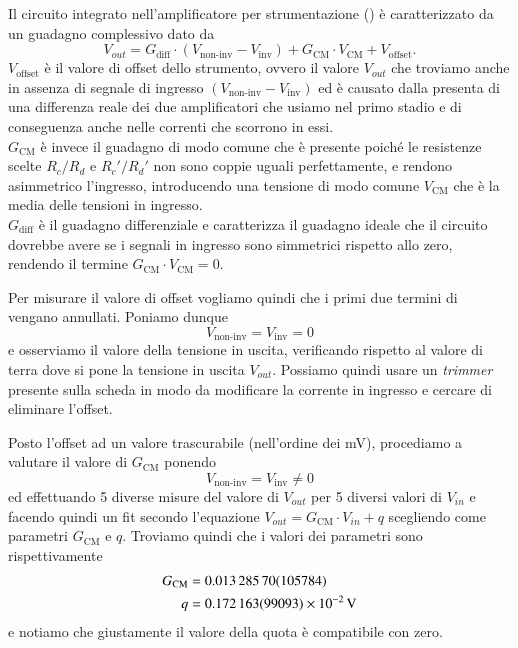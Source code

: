 \documentclass[
    rmp,
    reprint, 
    superscriptaddress, 
    altaffilletter, 
    amsmath, 
    amssymb,
    a4paper]{revtex4-2}
\begin{document}
Il circuito integrato nell'amplificatore per strumentazione () è caratterizzato da un guadagno complessivo dato da \begin{equation}V_{out} = G_{\text{diff}}\cdot \left(V_{\text{non-inv}}-V_{\text{inv}}\right) +  G_{\text{CM}}\cdot V_{\text{CM}} + V_{\text{offset}}.\label{eq:V_out=GtotVin}\end{equation}
$V_{\text{offset}}$ è il valore di offset dello strumento, ovvero il valore $V_{out}$ che troviamo anche in assenza di segnale di ingresso $\left(V_{\text{non-inv}}-V_{\text{inv}}\right)$ ed è causato dalla presenta di una differenza reale dei due amplificatori che usiamo nel primo stadio e di conseguenza anche nelle correnti che scorrono in essi.\\
$G_{\text{CM}}$ è invece il guadagno di modo comune che è presente poiché le resistenze scelte $R_c/R_d$ e $R_c'/R_d'$ non sono coppie uguali perfettamente, e rendono asimmetrico l'ingresso, introducendo una tensione di modo comune $V_{\text{CM}}$ che è la media delle tensioni in ingresso.\\
$G_{\text{diff}}$ è il guadagno differenziale e caratterizza il guadagno ideale che il circuito dovrebbe avere se i segnali in ingresso sono simmetrici rispetto allo zero, rendendo il termine $G_{\text{CM}}\cdot V_{\text{CM}} = 0$. 

Per misurare il valore di offset vogliamo quindi che i primi due termini di  vengano annullati. Poniamo dunque \[V_{\text{non-inv}}=V_{\text{inv}}=0\] e osserviamo il valore della tensione in uscita, verificando rispetto al valore di terra dove si pone la tensione in uscita $V_{out}$.
Possiamo quindi usare un \emph{trimmer} presente sulla scheda in modo da modificare la corrente in ingresso e cercare di eliminare l'offset.

Posto l'offset ad un valore trascurabile (nell'ordine dei \unit{\milli\volt}), procediamo a valutare il valore di $G_{\text{CM}}$ ponendo \[V_{\text{non-inv}}=V_{\text{inv}}\neq0\]
ed effettuando 5 diverse misure del valore di $V_{out}$ per 5 diversi valori di $V_{in}$ e facendo quindi un fit secondo l'equazione $V_{out}=G_{\text{CM}}\cdot V_{in}+q$ scegliendo come parametri $G_{\text{CM}}$ e $q$. Troviamo quindi che i valori dei parametri sono rispettivamente
\begin{align*}
    G_{\text{CM}} &=\num{0.0132857+-0.00105784} \\
    q &=\SI{0.172163+-0.099093e-2}{\volt} \\
\end{align*}
e notiamo che giustamente il valore della quota è compatibile con zero.
\end{document}
